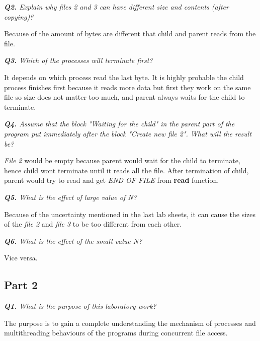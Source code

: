 \documentclass[11pt]{article}
\begin{document}
\vspace{3mm}
\textit{\textbf{Q2.} Explain why files 2 and 3 can have different size and contents (after copying)?}
\vspace{3mm}

Because of the amount of bytes are different that child and parent reads from the file.

\vspace{5mm}
\textit{\textbf{Q3.} Which of the processes will terminate first?}
\vspace{5mm}

It depends on which process read the last byte. It is highly probable the child process finishes first because it reads more data but first they work on the same file so size does not matter too much, and parent always waits for the child to terminate.

\vspace{5mm}
\textit{\textbf{Q4.} Assume that the block "Waiting for the child" in the parent part of the program put immediately after the block "Create new file 2". What will the result be?}
\vspace{5mm}

\textit{File 2} would be empty because parent would wait for the child to terminate, hence child wont terminate until it reads all the file. After termination of child, parent would try to read and get \textit{END OF FILE} from \textbf{read} function.

\vspace{5mm}
\textit{\textbf{Q5.} What is the effect of large value of N?}
\vspace{5mm}

Because of the uncertainty mentioned in the last lab sheets, it can cause the sizes of the \textit{file 2} and \textit{file 3} to be too different from each other.

\vspace{5mm}
\textit{\textbf{Q6.} What is the effect of the small value N?}
\vspace{5mm}

Vice versa.

\subsection*{Part 2}

\textit{\textbf{Q1.} What is the purpose of this laboratory work?}
\vspace{3mm}

The purpose is to gain a complete understanding the mechanism of processes and multithreading behaviours of the programs during concurrent file access.
\end{document}
